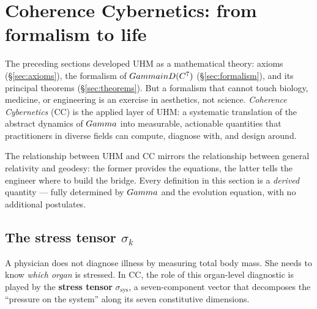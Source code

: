
\section{Coherence Cybernetics: from formalism to life}
\label{sec:cc}

The preceding sections developed UHM as a mathematical theory: axioms (\S\ref{sec:axioms}),
the formalism of $Gamma in D(C^7)$ (\S\ref{sec:formalism}), and its principal
theorems (\S\ref{sec:theorems}). But a formalism that cannot touch biology, medicine, or
engineering is an exercise in aesthetics, not science. \emph{Coherence Cybernetics} (CC) is
the applied layer of UHM: a systematic translation of the abstract dynamics of $Gamma$ into
measurable, actionable quantities that practitioners in diverse fields can compute, diagnose
with, and design around.

The relationship between UHM and CC mirrors the relationship between general relativity and
geodesy: the former provides the equations, the latter tells the engineer where to build the
bridge. Every definition in this section is a \emph{derived} quantity --- fully determined by
$Gamma$ and the evolution equation, with no additional postulates.

\subsection{The stress tensor $\sigma_k$}
\label{subsec:stress-tensor}

A physician does not diagnose illness by measuring total body mass.  She needs to know
\emph{which organ} is stressed.  In CC, the role of this organ-level diagnostic is played
by the \textbf{stress tensor} $\sigma_{\mathrm{sys}}$, a seven-component vector that
decomposes the ``pressure on the system'' along its seven constitutive dimensions.

